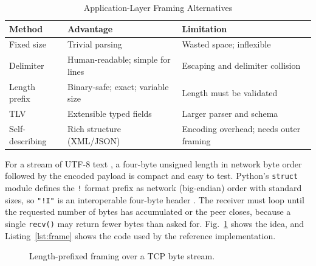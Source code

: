 \documentclass[conference]{IEEEtran}
\newcommand{\code}[1]{\texttt{#1}}
\begin{document}
\begin{table}[t]
\centering
\caption{Application-Layer Framing Alternatives}
\label{tab:framing}
\footnotesize
\begin{tabularx}{\columnwidth}{@{}l Y Y@{}}
\toprule
\textbf{Method} & \textbf{Advantage} & \textbf{Limitation} \\
\midrule
Fixed size & Trivial parsing & Wasted space; inflexible \\
Delimiter & Human-readable; simple for lines & Escaping and delimiter collision \\
Length prefix & Binary-safe; exact; variable size & Length must be validated \\
TLV & Extensible typed fields & Larger parser and schema \\
Self-describing & Rich structure (XML/JSON) & Encoding overhead; needs outer framing \\
\bottomrule
\end{tabularx}
\end{table}

For a stream of UTF-8 text \cite{rfc3629}, a four-byte unsigned length in network byte order followed by the encoded payload is compact and easy to test. Python's \code{struct} module defines the \code{!} format prefix as network (big-endian) order with standard sizes, so \code{"!I"} is an interoperable four-byte header \cite{pystruct}. The receiver must loop until the requested number of bytes has accumulated or the peer closes, because a single \code{recv()} may return fewer bytes than asked for. Fig.~\ref{fig:framing} shows the idea, and Listing~\ref{lst:frame} shows the code used by the reference implementation.

\begin{figure}[t]
\centering
{}
\caption{Length-prefixed framing over a TCP byte stream.}
\label{fig:framing}
\end{figure}
\end{document}
